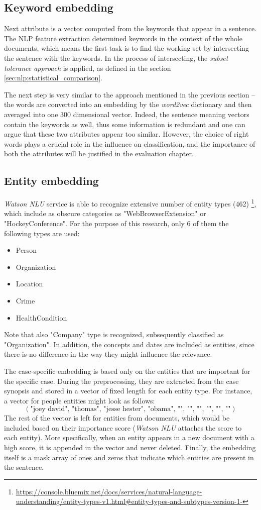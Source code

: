 \documentclass[
  digital, %
  notable,   %
  nolof,     %
  nolot,     %
]{fithesis3}
\begin{document}
\subsection{Keyword embedding}
Next attribute is a vector computed from the keywords that appear in a sentence.
The NLP feature extraction determined keywords in the context of the whole documents, which means the first task is to find the working set by intersecting the sentence with the keywords.
In the process of intersecting, the \textit{subset tolerance approach} is applied, as defined in the section \ref{sec:nlp:statistical_comparison}.

The next step is very similar to the approach mentioned in the previous section -- the words are converted into an embedding by the \textit{word2vec} dictionary and then averaged into one 300 dimensional vector.
Indeed, the sentence meaning vectors contain the keywords as well, thus some information is redundant and one can argue that these two attributes appear too similar.
However, the choice of right words plays a crucial role in the influence on classification, and the importance of both the attributes will be justified in the evaluation chapter.

\subsection{Entity embedding}
\label{sec:entity_embedding}
\textit{Watson NLU} service is able to recognize extensive number of entity types (462) \footnote{\url{https://console.bluemix.net/docs/services/natural-language-understanding/entity-types-v1.html\#entity-types-and-subtypes-version-1-}}, 
which include as obscure categories as "WebBrowserExtension" or "HockeyConference".
For the purpose of this research, only 6 of them the following types are used:
\begin{itemize}
\item Person
\item Organization
\item Location
\item Crime
\item HealthCondition
\end{itemize}
Note that also "Company" type is recognized, subsequently classified as "Organization".
In addition, the concepts and dates are included as entities, since there is no difference in the way they might influence the relevance.

The case-specific embedding is based only on the entities that are important for the specific case.
During the preprocessing, they are extracted from the case synopsis and stored in a vector of fixed length for each entity type. For instance, a vector for people entities might look as follows:
$$
(\text{"joey david", "thomas", "jesse hester", "obama", "", "", "", "", "", ""})
$$
The rest of the vector is left for entities from documents, which would be included based on their importance score (\textit{Watson NLU} attaches the score to each entity).
More specifically, when an entity appears in a new document with a high score, it is appended in the vector and never deleted.
Finally, the embedding itself is a mask array of ones and zeros that indicate which entities are present in the sentence.
\end{document}
